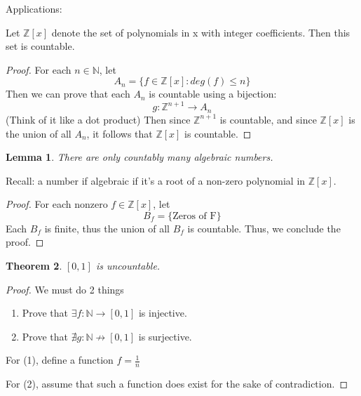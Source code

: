 \documentclass{article}
\newtheorem{theorem}{Theorem}[section]
\newtheorem{lemma}[theorem]{Lemma}
\begin{document}
Applications:

Let $\mathbb{Z}[x]$ denote the set of polynomials in x with integer coefficients. Then this set is countable. 

\begin{proof}
    For each $n \in \mathbb{N}$, let 
    \begin{equation}
        A_n = \{f \in \mathbb{Z}[x] : deg(f) \leq n\}
    \end{equation}
    Then we can prove that each $A_n$ is countable using a bijection:
    \begin{equation}
        g: \mathbb{Z}^{n+1} \rightarrow A_n
    \end{equation}
    (Think of it like a dot product)
    Then since $\mathbb{Z}^{n+1}$ is countable, and since $\mathbb{Z}[x]$ is the union of all $A_n$, it follows that $\mathbb{Z}[x]$ is countable. 
\end{proof}

\begin{lemma}
    There are only countably many algebraic numbers. 
\end{lemma}

Recall: a number if algebraic if it's a root of a non-zero polynomial in $\mathbb{Z}[x]$.

\begin{proof}
    For each nonzero $f \in \mathbb{Z}[x]$, let 
    \begin{equation}
        B_f = \{\textrm{Zeros of F}\}
    \end{equation}
    Each $B_f$ is finite, thus the union of all $B_f$ is countable. Thus, we conclude the proof. 
\end{proof}

\begin{theorem}
    $[0,1]$ is uncountable. 
\end{theorem}

\begin{proof}
    We must do 2 things
    \begin{enumerate}
        \item Prove that $\exists f : \mathbb{N} \rightarrow [0,1]$ is injective.
        \item Prove that $\nexists g : \mathbb{N} \nrightarrow [0,1]$ is surjective. 
    \end{enumerate}
    For (1), define a function $f = \frac{1}{n}$

    For (2), assume that such a function does exist for the sake of contradiction. 
\end{proof}
\end{document}
